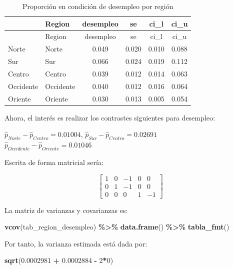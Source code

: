 \documentclass[
  spanish,
  12pt,
]{book}
\newenvironment{Shaded}{\begin{snugshade}}{\end{snugshade}}
\newcommand{\DecValTok}[1]{\textcolor[rgb]{0.00,0.00,0.81}{#1}}
\newcommand{\FloatTok}[1]{\textcolor[rgb]{0.00,0.00,0.81}{#1}}
\newcommand{\FunctionTok}[1]{\textcolor[rgb]{0.13,0.29,0.53}{\textbf{#1}}}
\newcommand{\NormalTok}[1]{#1}
\newcommand{\SpecialCharTok}[1]{\textcolor[rgb]{0.81,0.36,0.00}{\textbf{#1}}}
\begin{document}
\begin{longtable}[]{@{}llcccc@{}}
\caption{\label{tab:tab-svyby-desempleo-region}Proporción en condición de desempleo por región}\tabularnewline
\toprule\noalign{}
& Region & desempleo & se & ci\_l & ci\_u \\
\midrule\noalign{}
\endfirsthead
\toprule\noalign{}
& Region & desempleo & se & ci\_l & ci\_u \\
\midrule\noalign{}
\endhead
\bottomrule\noalign{}
\endlastfoot
Norte & Norte & 0.049 & 0.020 & 0.010 & 0.088 \\
Sur & Sur & 0.066 & 0.024 & 0.019 & 0.112 \\
Centro & Centro & 0.039 & 0.012 & 0.014 & 0.063 \\
Occidente & Occidente & 0.040 & 0.012 & 0.016 & 0.064 \\
Oriente & Oriente & 0.030 & 0.013 & 0.005 & 0.054 \\
\end{longtable}

Ahora, el interés es realizar los contrastes siguientes para desempleo:

\(\hat{p}_{Norte} - \hat{p}_{Centro} = 0.01004\),
\(\hat{p}_{Sur} - \hat{p}_{Centro} = 0.02691\)\\
\(\hat{p}_{Occidente} - \hat{p}_{Oriente} = 0.01046\)

Escrita de forma matricial sería:

\[
\left[\begin{array}{ccccc}
1 & 0 & -1 & 0 & 0\\
0 & 1 & -1 & 0 & 0\\
0 & 0 & 0 & 1 & -1
\end{array}\right]
\]

La matriz de varianzas y covarianzas es:

\begin{Shaded}
\begin{Highlighting}[]
\FunctionTok{vcov}\NormalTok{(tab\_region\_desempleo) }\SpecialCharTok{\%\textgreater{}\%}
  \FunctionTok{data.frame}\NormalTok{() }\SpecialCharTok{\%\textgreater{}\%}
  \FunctionTok{tabla\_fmt}\NormalTok{()}
\end{Highlighting}
\end{Shaded}

Por tanto, la varianza estimada está dada por:

\begin{Shaded}
\begin{Highlighting}[]
\FunctionTok{sqrt}\NormalTok{(}\FloatTok{0.0002981} \SpecialCharTok{+} \FloatTok{0.0002884} \SpecialCharTok{{-}} \DecValTok{2}\SpecialCharTok{*}\DecValTok{0}\NormalTok{)}
\end{Highlighting}
\end{Shaded}
\end{document}
